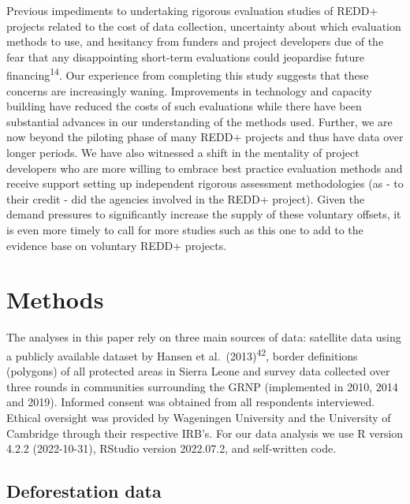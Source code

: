 \documentclass[
]{article}
\begin{document}
Previous impediments to undertaking rigorous evaluation studies of REDD+
projects related to the cost of data collection, uncertainty about which
evaluation methods to use, and hesitancy from funders and project
developers due of the fear that any disappointing short-term evaluations
could jeopardise future financing\textsuperscript{14}. Our experience
from completing this study suggests that these concerns are increasingly
waning. Improvements in technology and capacity building have reduced
the costs of such evaluations while there have been substantial advances
in our understanding of the methods used. Further, we are now beyond the
piloting phase of many REDD+ projects and thus have data over longer
periods. We have also witnessed a shift in the mentality of project
developers who are more willing to embrace best practice evaluation
methods and receive support setting up independent rigorous assessment
methodologies (as - to their credit - did the agencies involved in the
REDD+ project). Given the demand pressures to significantly increase the
supply of these voluntary offsets, it is even more timely to call for
more studies such as this one to add to the evidence base on voluntary
REDD+ projects.

\hypertarget{methods}{%
\section{Methods}\label{methods}}

The analyses in this paper rely on three main sources of data: satellite
data using a publicly available dataset by Hansen et
al.~(2013)\textsuperscript{42}, border definitions (polygons) of all
protected areas in Sierra Leone and survey data collected over three
rounds in communities surrounding the GRNP (implemented in 2010, 2014
and 2019). Informed consent was obtained from all respondents
interviewed. Ethical oversight was provided by Wageningen University and
the University of Cambridge through their respective IRB's. For our data
analysis we use R version 4.2.2 (2022-10-31), RStudio version 2022.07.2,
and self-written code.

\hypertarget{deforestation-data}{%
\subsection{Deforestation data}\label{deforestation-data}}
\end{document}
